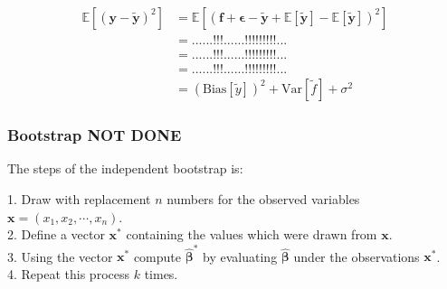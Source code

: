 \begin{align*}
\mathbb{E}\left[(\mathbf{y}-\mathbf{\tilde{y}})^2\right]
&=\mathbb{E}\left[(\mathbf{f}+\mathbf{\epsilon}-\mathbf{\tilde{y}}+\mathbb{E}\left[\mathbf{\tilde{y}}\right]-\mathbb{E}\left[\mathbf{\tilde{y}}\right])^2\right]
\\
&= ... ... !!! ... ... !!! !!! !!! ...
\\
&= ... ... !!! ... ... !!! !!! !!! ...
\\
&= ... ... !!! ... ... !!! !!! !!! ...
\\
&=\left(\mbox{Bias}\left[{\tilde y}\right] \right)^2 + \mbox{Var}\left[{\tilde f} \right] + \sigma^2
\end{align*}





\subsubsection{Bootstrap NOT DONE}
The steps of the independent bootstrap is:

\begin{mdframed}[backgroundcolor=black!10]
\raggedright
1. Draw with replacement $n$ numbers for the observed variables $\boldsymbol{x} = (x_1,x_2,\cdots,x_n)$. \\
2. Define a vector $\boldsymbol{x}^*$ containing the values which were drawn from $\boldsymbol{x}$. \\
3. Using the vector $\boldsymbol{x}^*$ compute $\boldsymbol{\hat\beta}^*$ by evaluating $\boldsymbol{\hat\beta}$ under the observations $\boldsymbol{x}^*$. \\
4. Repeat this process $k$ times. 
\end{mdframed}

